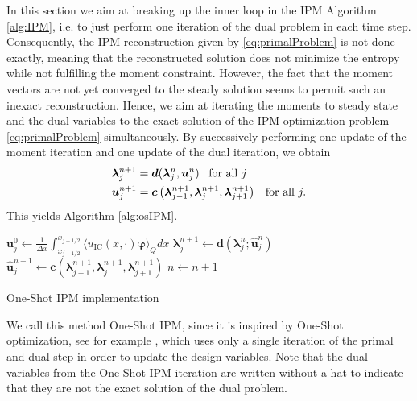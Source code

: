 In this section we aim at breaking up the inner loop in the IPM Algorithm \ref{alg:IPM}, i.e. to just perform one iteration of the dual problem in each time step. Consequently, the IPM reconstruction given by \eqref{eq:primalProblem} is not done exactly, meaning that the reconstructed solution does not minimize the entropy while not fulfilling the moment constraint. However, the fact that the moment vectors are not yet converged to the steady solution seems to permit such an inexact reconstruction. Hence, we aim at iterating the moments to steady state and the dual variables to the exact solution of the IPM optimization problem \eqref{eq:primalProblem} simultaneously.
By successively performing one update of the moment iteration and one update of the dual iteration, we obtain 
\begin{subequations}\label{eq:oneshotIPM}
\begin{align}
&\bm{\lambda}_{j}^{n+1} =  \bm{d}(\bm{\lambda}_j^{n},\bm{u}_j^{n}) \enskip \text{ for all }j \label{eq:oneshotIPMdual}\\
&\bm{u}_j^{n+1} =  \bm{c}\left(\bm{\lambda}_{j-1}^{n+1},\bm{\lambda}_{j}^{n+1},\bm{\lambda}_{j+1}^{n+1}\right) \enskip \text{ for all }j \label{eq:oneshotIPMmoment}.
\end{align}
\end{subequations}
This yields Algorithm \ref{alg:osIPM}.
\begin{algorithm}[H]
\begin{algorithmic}[1]
\State $\bm{u}_j^0 \leftarrow \frac{1}{\Delta x} \int_{x_{j-1/ 2}}^{x_{j+1/ 2}} \langle u_{\text{IC}}(x, \cdot) \bm{\varphi} \rangle_Q dx$
\EndFor
{}
\State $\bm{\lambda}_j^{n+1} \leftarrow \bm{d}(\bm{\lambda}_{j}^{n};\bm{\hat u}_j^{n})$
\EndFor
{}
\State $\bm{\hat u}_j^{n+1} \leftarrow \bm{c}(\bm{\lambda}_{j-1}^{n+1},\bm{\lambda}_j^{n+1},\bm{\lambda}_{j+1}^{n+1})$
\EndFor
\State $n \leftarrow n+1$
\EndWhile
\end{algorithmic}
\caption{One-Shot IPM implementation}
\label{alg:osIPM}
\end{algorithm}
We call this method One-Shot IPM, since it is inspired by One-Shot optimization, see for example \cite{hazra2005aerodynamic}, which uses only a single iteration of the primal and dual step in order to update the design variables. Note that the dual variables from the One-Shot IPM iteration are written without a hat to indicate that they are not the exact solution of the dual problem.

